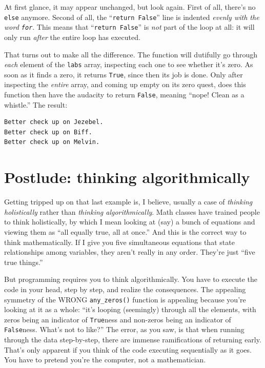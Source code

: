 
At first glance, it may appear unchanged, but look again. First of all, there's
no \texttt{else} anymore. Second of all, the ``\texttt{return False}'' line is
indented \textit{evenly with the word \texttt{for}}. This means that
``\texttt{return False}'' is \textit{not} part of the loop at all: it will only
run \textit{after} the entire loop has executed.

That turns out to make all the difference. The function will dutifully go
through \textit{each} element of the \texttt{labs} array, inspecting each one
to see whether it's zero. As soon as it finds a zero, it returns \texttt{True},
since then its job is done. Only after inspecting the \textit{entire} array,
and coming up empty on its zero quest, does this function then have the
audacity to return \texttt{False}, meaning ``nope! Clean as a whistle.'' The
result:

\begin{Verbatim}[fontsize=\small,samepage=true,frame=leftline,framesep=5mm,framerule=1mm]
Better check up on Jezebel.
Better check up on Biff.
Better check up on Melvin.
\end{Verbatim}

\section{Postlude: thinking algorithmically}


Getting tripped up on that last example is, I believe, usually a case of
\textit{thinking holistically} rather than \textit{thinking algorithmically}.
Math classes have trained people to think holistically, by which I mean looking
at (say) a bunch of equations and viewing them as ``all equally true, all at
once.'' And this is the correct way to think mathematically. If I give you five
simultaneous equations that state relationships among variables, they aren't
really in any order. They're just ``five true things.''

But programming requires you to think algorithmically. You have to execute the
code in your head, step by step, and realize the consequences. The appealing
symmetry of the WRONG \texttt{any\_zeros()} function is appealing because
you're looking at it as a whole: ``it's looping (seemingly) through all the
elements, with zeros being an indicator of \texttt{True}ness and non-zeros
being an indicator of \texttt{False}ness. What's not to like?'' The error, as
you saw, is that when running through the data step-by-step, there are immense
ramifications of returning early. That's only apparent if you think of the code
executing sequentially as it goes. You have to pretend you're the computer, not
a mathematician.

